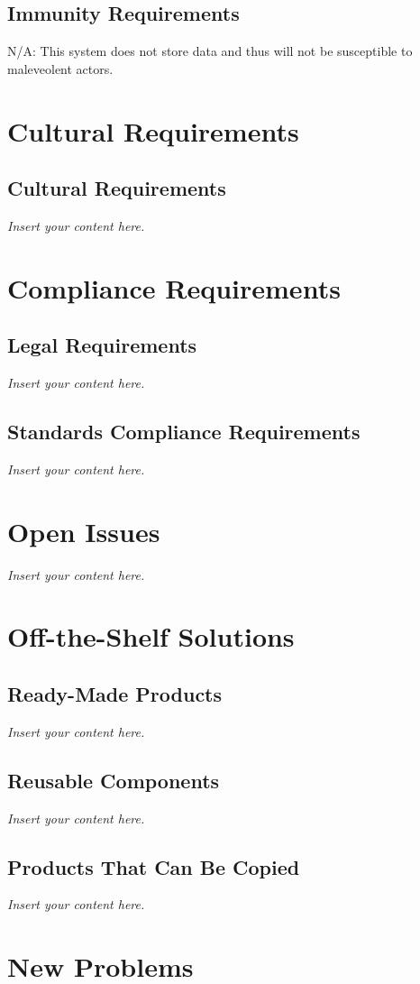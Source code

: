 \documentclass[12pt]{article}
\newcommand{\lips}{\textit{Insert your content here.}}
\begin{document}
\subsection{Immunity Requirements}
N/A: This system does not store data and thus will not be susceptible to maleveolent actors.


\section{Cultural Requirements}
\subsection{Cultural Requirements}
\lips

\section{Compliance Requirements}
\subsection{Legal Requirements}
\lips
\subsection{Standards Compliance Requirements}
\lips

\section{Open Issues}
\lips

\section{Off-the-Shelf Solutions}
\subsection{Ready-Made Products}
\lips
\subsection{Reusable Components}
\lips
\subsection{Products That Can Be Copied}
\lips

\section{New Problems}
\end{document}
